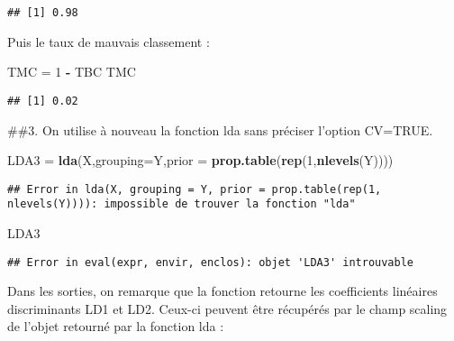 \documentclass[
]{article}
\newenvironment{Shaded}{\begin{snugshade}}{\end{snugshade}}
\newcommand{\DataTypeTok}[1]{\textcolor[rgb]{0.13,0.29,0.53}{#1}}
\newcommand{\DecValTok}[1]{\textcolor[rgb]{0.00,0.00,0.81}{#1}}
\newcommand{\KeywordTok}[1]{\textcolor[rgb]{0.13,0.29,0.53}{\textbf{#1}}}
\newcommand{\NormalTok}[1]{#1}
\newcommand{\OperatorTok}[1]{\textcolor[rgb]{0.81,0.36,0.00}{\textbf{#1}}}
\newcommand{\StringTok}[1]{\textcolor[rgb]{0.31,0.60,0.02}{#1}}
\begin{document}
\begin{verbatim}
## [1] 0.98
\end{verbatim}

Puis le taux de mauvais classement :

\begin{Shaded}
\begin{Highlighting}[]
\NormalTok{TMC =}\StringTok{ }\DecValTok{1} \OperatorTok{-}\StringTok{ }\NormalTok{TBC}
\NormalTok{TMC}
\end{Highlighting}
\end{Shaded}

\begin{verbatim}
## [1] 0.02
\end{verbatim}

\#\#3. On utilise à nouveau la fonction lda sans préciser l'option
CV=TRUE.

\begin{Shaded}
\begin{Highlighting}[]
\NormalTok{LDA3 =}\StringTok{ }\KeywordTok{lda}\NormalTok{(X,}\DataTypeTok{grouping=}\NormalTok{Y,}\DataTypeTok{prior =} \KeywordTok{prop.table}\NormalTok{(}\KeywordTok{rep}\NormalTok{(}\DecValTok{1}\NormalTok{,}\KeywordTok{nlevels}\NormalTok{(Y))))}
\end{Highlighting}
\end{Shaded}

\begin{verbatim}
## Error in lda(X, grouping = Y, prior = prop.table(rep(1, nlevels(Y)))): impossible de trouver la fonction "lda"
\end{verbatim}

\begin{Shaded}
\begin{Highlighting}[]
\NormalTok{LDA3}
\end{Highlighting}
\end{Shaded}

\begin{verbatim}
## Error in eval(expr, envir, enclos): objet 'LDA3' introuvable
\end{verbatim}

Dans les sorties, on remarque que la fonction retourne les coefficients
linéaires discriminants LD1 et LD2. Ceux-ci peuvent être récupérés par
le champ scaling de l'objet retourné par la fonction lda :

\begin{Shaded}
\end{Shaded}
\end{document}
